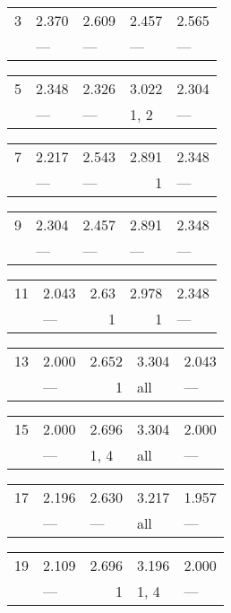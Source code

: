 \begin{tabular}{lllll}
\toprule
 3 & 2.370 & 2.609 & 2.457 & 2.565 \\
   & ---   & ---   & ---   & ---   \\
\bottomrule
\end{tabular}
\begin{tabular}{lllll}
\toprule
 5 & 2.348 & 2.326 & 3.022 & 2.304 \\
   & ---   & ---   & 1, 2  & ---   \\
\bottomrule
\end{tabular}
\begin{tabular}{lllrl}
\toprule
 7 & 2.217 & 2.543 & 2.891 & 2.348 \\
   & ---   & ---   & 1     & ---   \\
\bottomrule
\end{tabular}
\begin{tabular}{lllll}
\toprule
 9 & 2.304 & 2.457 & 2.891 & 2.348 \\
   & ---   & ---   & ---   & ---   \\
\bottomrule
\end{tabular}
\begin{tabular}{llrrl}
\toprule
 11 & 2.043 & 2.63 & 2.978 & 2.348 \\
    & ---   & 1    & 1     & ---   \\
\bottomrule
\end{tabular}
\begin{tabular}{llrll}
\toprule
 13 & 2.000 & 2.652 & 3.304 & 2.043 \\
    & ---   & 1     & all   & ---   \\
\bottomrule
\end{tabular}
\begin{tabular}{lllll}
\toprule
 15 & 2.000 & 2.696 & 3.304 & 2.000 \\
    & ---   & 1, 4  & all   & ---   \\
\bottomrule
\end{tabular}
\begin{tabular}{lllll}
\toprule
 17 & 2.196 & 2.630 & 3.217 & 1.957 \\
    & ---   & ---   & all   & ---   \\
\bottomrule
\end{tabular}
\begin{tabular}{llrll}
\toprule
 19 & 2.109 & 2.696 & 3.196 & 2.000 \\
    & ---   & 1     & 1, 4  & ---   \\
\bottomrule
\end{tabular}
